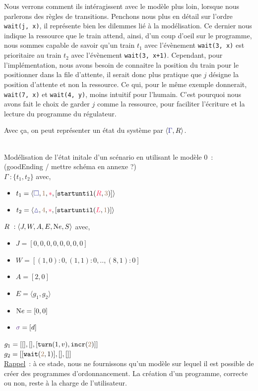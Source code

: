 \documentclass[oneside, a4paper, 11pt]{book}
\newcommand{\trainFmt}[1]{{\color{traincolor} #1}}
\newcommand{\trainTuple}[4]{\langle \trainFmt{#1}, \posFmt{#2}, \dirFmt{#3}, #4 \rangle}
\newcommand{\dirFmt}[1]{{\color{dircolor} #1}}
\newcommand{\posFmt}[1]{{\color{poscolor}{#1}}}
\newcommand{\su}[2]{{\mbox{$\mathtt{startuntil}(\dirFmt{#1}, \posFmt{#2})$}}}
\newcommand{\incr}[1]{{\mbox{\ensuremath{\mathtt{incr}(\posFmt{#1})}}}}
\newcommand{\turnOrder}[2]{{\mbox{\ensuremath{\mathtt{turn}(#1, #2)}}}}
\newcommand{\wait}[2]{{\mbox{\ensuremath{\mathtt{wait}(\posFmt{#1}, #2)}}}}
\newcommand{\swFmt}[1]{{\color{swcolor}{#1}}}
\begin{document}
\noindent
Nous verrons comment ils intéragissent avec le modèle plus loin, lorsque nous parlerons des règles de transitions. Penchons nous plus en détail sur l'ordre \texttt{wait(j, x)}, il représente bien les dilemmes lié à la modélisation.
Ce dernier nous indique la ressource que le train attend, ainsi, d'un coup d'oeil sur le programme, nous sommes capable de savoir qu'un train $t_1$ avec l'évènement \texttt{wait(3, x)} est prioritaire au train $t_2$ avec l'évènement \texttt{wait(3, x+1)}.
Cependant, pour l'implémentation, nous avons besoin de connaitre la position du train pour le positionner dans la file d'attente, il serait donc plus pratique que $j$ désigne la position d'attente et non la ressource.
Ce qui, pour le même exemple donnerait, \texttt{wait(7, x)} et \texttt{wait(4, y)}, moins intuitif pour l'humain.
C'est pourquoi nous avons fait le choix de garder $j$ comme la ressource, pour faciliter l'écriture et la lecture du programme du régulateur.



\noindent
Avec ça, on peut représenter un état du système par $\langle \trainFmt{\Gamma}, R \rangle$.

\begin{example}[GoodEnding M0]
	~\\
	Modélisation de l'état initale d'un scénario en utilisant le modèle 0~: (goodEnding / mettre schéma en annexe ?)
	\\$\Gamma~: \{t_1, t_2\}$ avec,
	\begin{itemize}
		\item[] $t_1 = \trainTuple{\square}{1}{*}{[\su{R}{3}]}$
		\item[] $t_2 = \trainTuple{\vartriangle}{4}{*}{[\su{L}{1}]}$
	\end{itemize}
	\vspace{0.3cm}
	$R~: \langle J,W,A,E,{\text Ne},S \rangle$ avec,	
	\begin{itemize}
		\item[] $J = [0,0,0,0,0,0,0,0]$
		\item[] $W = [(1,0) : 0, (1,1) : 0, .., (8,1) : 0]$
		\item[] $A = [2,0]$
		\item[] $E = \langle g_1, g_2 \rangle$
		\item[] ${\text Ne} = [0, 0]$
		\item[] $\swFmt{\sigma} = [d]$
	\end{itemize}
	\vspace{0.3cm}
	$g_1 = [[],[],[\turnOrder{1}{v}, \incr{2}]]$
	\\$g_2 = [[\wait{2}{1}],[],[]]$
	\vspace{0.5cm}\\
	\underline{Rappel}~: à ce stade, nous ne fournissons qu'un modèle sur lequel il est possible de créer des programmes d'ordonnancement. La création d'un programme, correcte ou non, reste à la charge de l'utilisateur.
\end{example}
\end{document}
